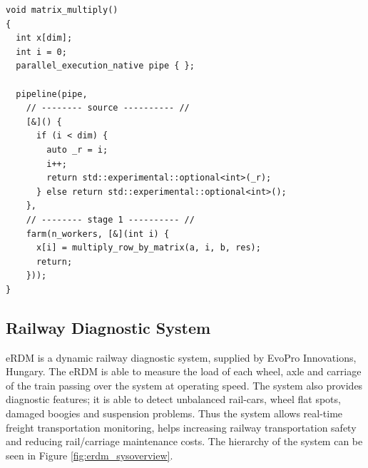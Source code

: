 \begin{small}
  \begin{lstlisting}[caption=GrPPI Matrix Multiplication\label{lst:matmult_grppi}]
void matrix_multiply()
{
  int x[dim];
  int i = 0;
  parallel_execution_native pipe { };

  pipeline(pipe,
    // -------- source ---------- //
    [&]() {
      if (i < dim) {
        auto _r = i;
        i++;
        return std::experimental::optional<int>(_r);
      } else return std::experimental::optional<int>();
    },
    // -------- stage 1 ---------- //
    farm(n_workers, [&](int i) {
      x[i] = multiply_row_by_matrix(a, i, b, res);
      return;
    }));
}
  \end{lstlisting}  
\end{small}

\begin{figure}[t]
  \centering
{}
\end{figure}






\subsection{Railway Diagnostic System}

eRDM is a dynamic railway diagnostic system, supplied by EvoPro Innovations, Hungary. The eRDM is able to measure the load of each wheel, axle and carriage of the train passing over the system at operating speed. The system also provides diagnostic features; it is able to detect unbalanced rail-cars, wheel flat spots, damaged boogies and suspension problems. Thus the system allows real-time freight transportation monitoring, helps increasing railway transportation safety and reducing rail/carriage maintenance costs. The hierarchy of the system can be seen in Figure \ref{fig:erdm_sysoverview}.

